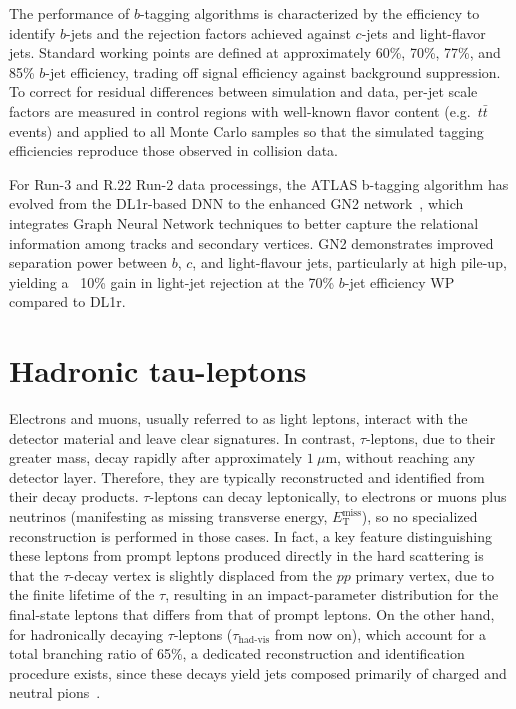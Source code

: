The performance of $b$-tagging algorithms is characterized by the efficiency to identify $b$-jets and the rejection factors achieved against $c$-jets and light-flavor jets.  Standard working points are defined at approximately 60\%, 70\%, 77\%, and 85\% $b$-jet efficiency, trading off signal efficiency against background suppression.  To correct for residual differences between simulation and data, per-jet scale factors are measured in control regions with well-known flavor content (e.g.\ $t\bar t$ events) and applied to all Monte Carlo samples so that the simulated tagging efficiencies reproduce those observed in collision data.

For Run-3 and R.22 Run-2 data processings, the ATLAS b-tagging algorithm has evolved from the DL1r-based DNN to the enhanced GN2 network~\cite{new_tagging}, which integrates Graph Neural Network techniques to better capture the relational information among tracks and secondary vertices. GN2 demonstrates improved separation power between \(b\), \(c\), and light-flavour jets, particularly at high pile-up, yielding a ~10\% gain in light-jet rejection at the 70\% \(b\)-jet efficiency WP compared to DL1r.  


\section{Hadronic tau-leptons}
\label{sec:tauhad}
Electrons and muons, usually referred to as light leptons, interact with the detector material and leave clear signatures. In contrast, \(\tau\)-leptons, due to their greater mass, decay rapidly after approximately \(1\ \mu\mathrm{m}\), without reaching any detector layer. Therefore, they are typically reconstructed and identified from their decay products. \(\tau\)-leptons can decay leptonically, to electrons or muons plus neutrinos (manifesting as missing transverse energy, \(E_{\mathrm{T}}^{\mathrm{miss}}\)), so no specialized reconstruction is performed in those cases. 
In fact, a key feature distinguishing these leptons from prompt leptons produced directly in the hard scattering is that the \(\tau\)-decay vertex is slightly displaced from the \(pp\) primary vertex, due to the finite lifetime of the \(\tau\), resulting in an impact-parameter distribution for the final-state leptons that differs from that of prompt leptons. 
On the other hand, for hadronically decaying \(\tau\)-leptons (\(\tau_{\text{had-vis}}\) from now on), which account for a total branching ratio of 65\%, a dedicated reconstruction and identification procedure exists, since these decays yield jets composed primarily of charged and neutral pions~\cite{ParticleDataGroup}.


